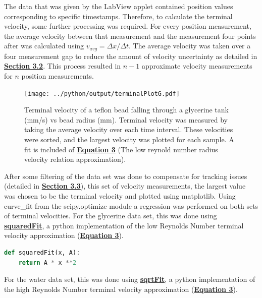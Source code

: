 \documentclass[
	letterpaper
	12pt
]{template}
\newcommand{\bref}[2]{\textbf{\hyperref[#1]{#2}}}
\begin{document}
The data that was given by the LabView applet contained position values corresponding to specific timestamps. Therefore, to calculate the terminal velocity, some further processing was required. For every position measurement, the average velocity between that measurement and the measurement four points after was calculated using $v_{avg} = \Delta x/ \Delta t$. The average velocity was taken over a four measurement gap to reduce the amount of velocity uncertainty as detailed in \bref{sec::uncertainty}{Section 3.2}. This process resulted in $n-1$ approximate velocity measurements for $n$ position measurements. \vspace{\baselineskip}

\begin{figure}\label{fig::terminalPlotG}
	\vspace{-30pt}
	\centering
	\texttt{[image: ../python/output/terminalPlotG.pdf]}
	\caption{Terminal velocity of a teflon bead falling through a glycerine tank (mm/s) vs bead radius (mm). Terminal velocity was measured by taking the average velocity over each time interval. These velocities were sorted, and the largest velocity was plotted for each sample. A fit is included of \bref{eqn::terminalVelocity}{Equation 3} (The low reynold number radius velocity relation approximation).}
	\vspace{-50pt}
\end{figure}
After some filtering of the data set was done to compensate for tracking issues (detailed in \bref{sec::filtering}{Section 3.3}), this set of velocity measurements, the largest value was chosen to be the terminal velocity and plotted using matplotlib. Using curve\_fit from the scipy.optimize module a regression was performed on both sets of terminal velocities. For the glycerine data set, this was done using \bref{fnc::squaredFit}{squaredFit}, a python implementation of the low Reynolds Number terminal velocity approximation (\bref{eqn::terminalVelocity}{Equation 3}).

\begin{lstlisting}[label={fnc::squaredFit},captionpos=b,language=python]
def squaredFit(x, A):
	return A * x **2
\end{lstlisting}

For the water data set, this was done using \bref{fnc::sqrtFit}{sqrtFit}, a python implementation of the high Reynolds Number terminal velocity approximation (\bref{eqn::terminalVelocity}{Equation 3}).\vspace{0pt}
\end{document}
